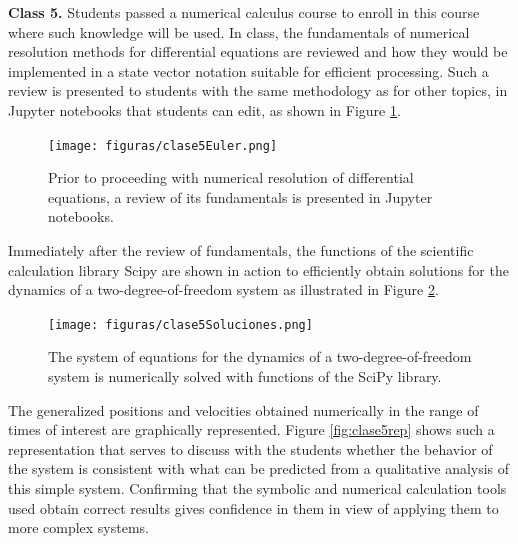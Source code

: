 



\textbf{Class 5.} Students passed a numerical calculus course to enroll in this course where such knowledge will be used. In class, the fundamentals of numerical resolution methods for differential equations are reviewed and how they would be implemented in a state vector notation suitable for efficient processing. Such a review is presented to students with the same methodology as for other topics, in Jupyter notebooks that students can edit, as shown in Figure \ref{fig:clase5res}.

\begin{figure}[!ht]
\centering
\texttt{[image: figuras/clase5Euler.png]}
\caption{Prior to proceeding with numerical resolution of differential equations, a review of its fundamentals is presented in Jupyter notebooks.}
\label{fig:clase5res}
\end{figure}

Immediately after the review of fundamentals, the functions of the scientific calculation library Scipy are shown in action to efficiently obtain solutions for the dynamics of a two-degree-of-freedom system as illustrated in Figure \ref{fig:clase5sol}.

\begin{figure}[!ht]
\centering
\texttt{[image: figuras/clase5Soluciones.png]}
\caption{The system of equations for the dynamics of a two-degree-of-freedom system is numerically solved with functions of the SciPy library.}
\label{fig:clase5sol}
\end{figure}

The generalized positions and velocities obtained numerically in the range of times of interest are graphically represented. Figure \ref{fig:clase5rep} shows such a representation that serves to discuss with the students whether the behavior of the system is consistent with what can be predicted from a qualitative analysis of this simple system. Confirming that the symbolic and numerical calculation tools used obtain correct results gives confidence in them in view of applying them to more complex systems.

